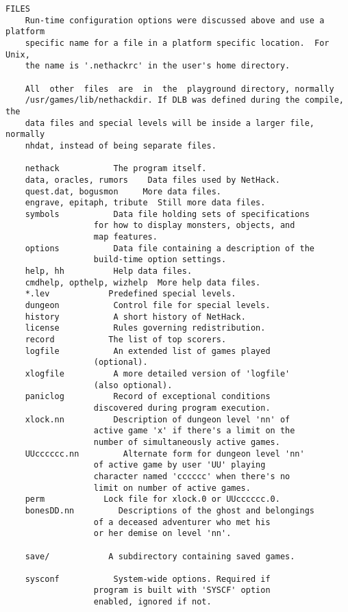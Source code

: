 \documentclass[11pt]{article}
\begin{document}
\begin{verbatim}
FILES
    Run-time configuration options were discussed above and use a platform
    specific name for a file in a platform specific location.  For Unix,
    the name is '.nethackrc' in the user's home directory.

    All  other  files  are  in  the  playground directory, normally
    /usr/games/lib/nethackdir. If DLB was defined during the compile, the
    data files and special levels will be inside a larger file, normally
    nhdat, instead of being separate files.

    nethack           The program itself.
    data, oracles, rumors    Data files used by NetHack.
    quest.dat, bogusmon     More data files.
    engrave, epitaph, tribute  Still more data files.
    symbols           Data file holding sets of specifications
                  for how to display monsters, objects, and
                  map features.
    options           Data file containing a description of the
                  build-time option settings.
    help, hh          Help data files.
    cmdhelp, opthelp, wizhelp  More help data files.
    *.lev            Predefined special levels.
    dungeon           Control file for special levels.
    history           A short history of NetHack.
    license           Rules governing redistribution.
    record           The list of top scorers.
    logfile           An extended list of games played
                  (optional).
    xlogfile          A more detailed version of 'logfile'
                  (also optional).
    paniclog          Record of exceptional conditions
                  discovered during program execution.
    xlock.nn          Description of dungeon level 'nn' of
                  active game 'x' if there's a limit on the
                  number of simultaneously active games.
    UUcccccc.nn         Alternate form for dungeon level 'nn'
                  of active game by user 'UU' playing
                  character named 'cccccc' when there's no
                  limit on number of active games.
    perm            Lock file for xlock.0 or UUcccccc.0.
    bonesDD.nn         Descriptions of the ghost and belongings
                  of a deceased adventurer who met his
                  or her demise on level 'nn'.

    save/            A subdirectory containing saved games.

    sysconf           System-wide options. Required if
                  program is built with 'SYSCF' option
                  enabled, ignored if not.


\end{verbatim}
\end{document}
